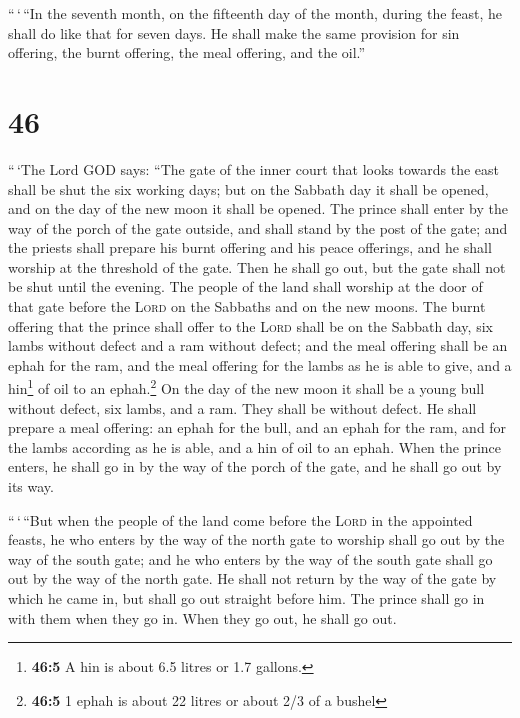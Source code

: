  ``\,`\,``In the seventh month, on the fifteenth day of
the month, during the feast, he shall do like that for seven days. He
shall make the same provision for sin offering, the burnt offering, the
meal offering, and the oil.''

\hypertarget{section-45}{%
\section{46}\label{section-45}}

 ``\,`The Lord GOD says: ``The gate of the inner court
that looks towards the east shall be shut the six working days; but on
the Sabbath day it shall be opened, and on the day of the new moon it
shall be opened.  The prince shall enter by the way of the
porch of the gate outside, and shall stand by the post of the gate; and
the priests shall prepare his burnt offering and his peace offerings,
and he shall worship at the threshold of the gate. Then he shall go out,
but the gate shall not be shut until the evening.  The
people of the land shall worship at the door of that gate before the
\textsc{Lord} on the Sabbaths and on the new moons.  The
burnt offering that the prince shall offer to the \textsc{Lord} shall be
on the Sabbath day, six lambs without defect and a ram without defect;
 and the meal offering shall be an ephah for the ram, and
the meal offering for the lambs as he is able to give, and a
hin\footnote{\textbf{46:5} A hin is about 6.5 litres or 1.7 gallons.} of
oil to an ephah.\footnote{\textbf{46:5} 1 ephah is about 22 litres or
  about 2/3 of a bushel}  On the day of the new moon it
shall be a young bull without defect, six lambs, and a ram. They shall
be without defect.  He shall prepare a meal offering: an
ephah for the bull, and an ephah for the ram, and for the lambs
according as he is able, and a hin of oil to an ephah. 
When the prince enters, he shall go in by the way of the porch of the
gate, and he shall go out by its way.

 ``\,`\,``But when the people of the land come before the
\textsc{Lord} in the appointed feasts, he who enters by the way of the
north gate to worship shall go out by the way of the south gate; and he
who enters by the way of the south gate shall go out by the way of the
north gate. He shall not return by the way of the gate by which he came
in, but shall go out straight before him.  The prince
shall go in with them when they go in. When they go out, he shall go
out.

